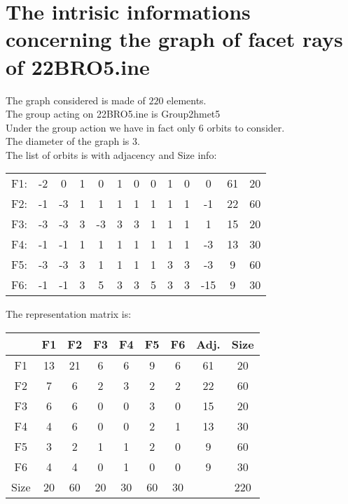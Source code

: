 \documentclass[12pt]{article}
\begin{document}
\section{The intrisic informations concerning the graph of facet rays of 22BRO5.ine}
The graph considered is made of $220$ elements.\\
The group acting on 22BRO5.ine is Group2hmet5\\
Under the group action we have in fact only $6$ orbits to consider.\\
The diameter of the graph is $3$.\\
The list of orbits is with adjacency and Size info:
\begin{center}
\scriptsize
\begin{tabular}{ccccccccccc|c|c}
F1:&-2&0&1&0&1&0&0&1&0&0&61&20\\
F2:&-1&-3&1&1&1&1&1&1&1&-1&22&60\\
F3:&-3&-3&3&-3&3&3&1&1&1&1&15&20\\
F4:&-1&-1&1&1&1&1&1&1&1&-3&13&30\\
F5:&-3&-3&3&1&1&1&1&3&3&-3&9&60\\
F6:&-1&-1&3&5&3&3&5&3&3&-15&9&30\\
\end{tabular}
\end{center}
The representation matrix is:
\begin{center}
\scriptsize
\begin{tabular}{|c|cccccc|c|c|}
\hline
&F1&F2&F3&F4&F5&F6&Adj.&Size\\
\hline
F1& 13& 21& 6& 6& 9& 6&61&20\\
F2& 7& 6& 2& 3& 2& 2&22&60\\
F3& 6& 6& 0& 0& 3& 0&15&20\\
F4& 4& 6& 0& 0& 2& 1&13&30\\
F5& 3& 2& 1& 1& 2& 0&9&60\\
F6& 4& 4& 0& 1& 0& 0&9&30\\
\hline
Size&20&60&20&30&60&30&&220\\
\hline
\end{tabular}
\end{center}
\end{document}
